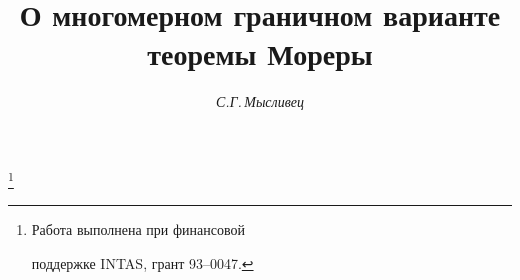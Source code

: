 









\newcommand{\tts}[1]{}


\renewcommand{\baselinestretch}{0.94}







 


\setcounter{page}{33}















\author{\it С.Г.\,Мысливец}




\title{О многомерном граничном варианте \\ теоремы Мореры}


\thanks{Работа выполнена при финансовой


поддержке INTAS, грант 93--0047.}


\date{}







\pagestyle{plain} %







\maketitle


